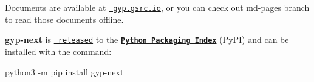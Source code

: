 Documents are available at \href{https://gyp.gsrc.io}{\texttt{ gyp.\+gsrc.\+io}}, or you can check out {\ttfamily md-\/pages} branch to read those documents offline.

{\bfseries{gyp-\/next}} is \href{https://github.com/nodejs/gyp-next/releases}{\texttt{ released}} to the \href{https://pypi.org/project/gyp-next}{\texttt{ {\bfseries{Python Packaging Index}}}} (Py\+PI) and can be installed with the command\+:
\begin{DoxyItemize}
\item {\ttfamily python3 -\/m pip install gyp-\/next} 
\end{DoxyItemize}